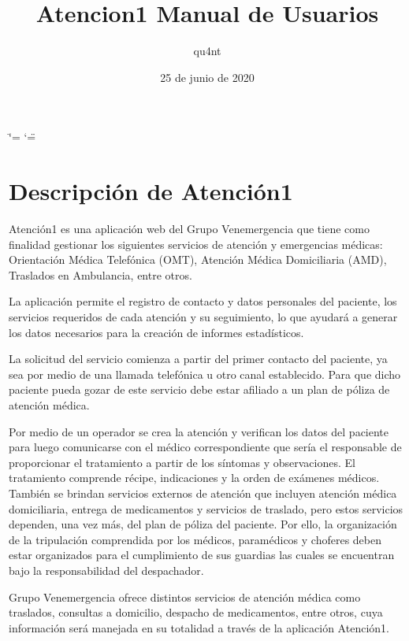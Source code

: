 \documentclass[letterpaper,10pt,spanish]{sphinxmanual}
\title{Atencion\sphinxhyphen{}1 Manual de Usuarios}
\date{25 de junio de 2020}
\author{qu4nt}
\begin{document}
\ifdefined\shorthandoff
  \ifnum\catcode`\=\string=\active\shorthandoff{=}\fi
  \ifnum\catcode`\"=\active{}\fi
\fi

\pagestyle{empty}
\sphinxmaketitle
\pagestyle{plain}
\sphinxtableofcontents
\pagestyle{normal}
\label{\detokenize{index::doc}}
\noindent{}




\chapter{Descripción de Atención\sphinxhyphen{}1}
\label{\detokenize{01descripcion_software:descripcion-de-atencion-1}}\label{\detokenize{01descripcion_software::doc}}
Atención\sphinxhyphen{}1 es una aplicación web del Grupo Venemergencia que tiene como finalidad gestionar los siguientes servicios de atención y emergencias médicas: Orientación Médica Telefónica (OMT), Atención Médica Domiciliaria (AMD), Traslados en Ambulancia, entre otros.

La aplicación permite el registro de contacto y datos personales del paciente, los servicios requeridos de cada atención y su seguimiento, lo que ayudará a generar los datos necesarios para la creación de informes estadísticos.

La solicitud del servicio comienza a partir del primer contacto del paciente, ya sea por medio de una llamada telefónica u otro canal establecido. Para que dicho paciente pueda gozar de este servicio debe estar afiliado a un plan de póliza de atención médica.

Por medio de un operador se crea la atención y verifican los datos del paciente para luego comunicarse con el médico correspondiente que sería el responsable de proporcionar el tratamiento a partir de los síntomas y observaciones. El tratamiento comprende récipe, indicaciones y la orden de exámenes médicos. También se brindan servicios externos de atención que incluyen atención médica domiciliaria, entrega de medicamentos y servicios de traslado, pero estos servicios dependen, una vez más, del plan de póliza del paciente. Por ello, la organización de la tripulación comprendida por los médicos, paramédicos y choferes deben estar organizados para el cumplimiento de sus guardias las cuales se encuentran bajo la responsabilidad del despachador.

Grupo Venemergencia ofrece distintos servicios de atención médica como traslados, consultas a domicilio, despacho de medicamentos, entre otros, cuya información será manejada en su totalidad a través de la aplicación Atención\sphinxhyphen{}1.
\end{document}
